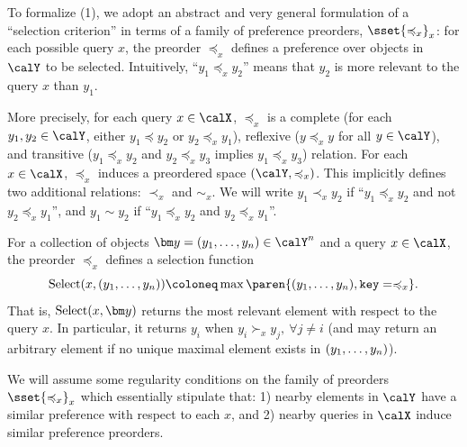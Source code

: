 To formalize (1), we adopt an abstract and very general formulation of a ``selection criterion'' in terms of a family of preference preorders, $\sset{\preceq_x}_x$: for each possible query $x$, the preorder $\preceq_x$ defines a preference over objects in $\calY$ to be selected. Intuitively, ``$y_1 \preceq_x y_2$'' means that $y_2$ is more relevant to the query $x$ than $y_1$.

More precisely, for each query $x \in \calX$, $\preceq_x$ is a complete (for each $y_1, y_2 \in \calY$, either $y_1 \preceq y_2$ or $y_2 \preceq_x y_1$), reflexive ($y \preceq_x y$ for all $y \in \calY$), and transitive ($y_1 \preceq_x y_2$ and $y_2 \preceq_x y_3$ implies $y_1 \preceq_x y_3$) relation. For each $x \in \calX$, $\preceq_x$ induces a preordered space $(\calY, \preceq_x)$. This implicitly defines two additional relations: $\prec_x$ and $\sim_x$. We will write $y_1 \prec_x y_2$ if ``$y_1 \preceq_x y_2$ and not $y_2 \preceq_x y_1$'', and $y_1 \sim y_2$ if ``$y_1 \preceq_x y_2$ and $y_2 \preceq_x y_1$''.

For a collection of objects $\y = \ys \in \calY^n$ and a query $x \in \calX$, the preorder $\preceq_x$ defines a selection function
\begin{equation}\label{eq:def_selection}
  \mathrm{Select}(x, \ys) \coloneq \max\paren{\ys, \mathtt{key}=\preceq_x}.
\end{equation}
That is, $\mathrm{Select}(x, \y)$ returns the most relevant element with respect to the query $x$. In particular, it returns $y_i$ when $y_i \succ_x y_j, \ \forall j \neq i$ (and may return an arbitrary element if no unique maximal element exists in $(y_1, \ldots, y_n)$).

We will assume some regularity conditions on the family of preorders $\sset{\preceq_x}_x$ which essentially stipulate that: 1) nearby elements in $\calY$ have a similar preference with respect to each $x$, and 2) nearby queries in $\calX$ induce similar preference preorders.

